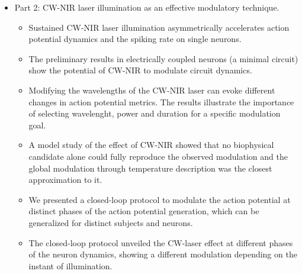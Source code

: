 \begin{itemize}
\begin{itemize}
 \end{itemize}
	\item Part 2: CW-NIR laser illumination as an effective modulatory technique.
     \begin{itemize}
         \item Sustained CW-NIR laser illumination asymmetrically accelerates action potential dynamics and the spiking rate on single neurons.
         \item The preliminary results in electrically coupled neurons (a minimal circuit) show the potential of CW-NIR to modulate circuit dynamics.
         \item    Modifying the wavelengths of the CW-NIR laser can evoke different changes in action potential metrics. The results illustrate the importance of selecting  wavelenght, power and duration for a specific modulation goal.
         \item A model study of the effect of CW-NIR showed that no biophysical candidate alone could fully reproduce the observed modulation and the global modulation through temperature description was the closest approximation to it.
         \item We presented a closed-loop protocol to modulate the action potential at distinct phases of the action potential generation, which can be generalized for distinct subjects and neurons.
         \item The closed-loop protocol unveiled the CW-laser effect at different phases of the neuron dynamics, showing a different modulation depending on the instant of illumination.
     \end{itemize}
\end{itemize}


